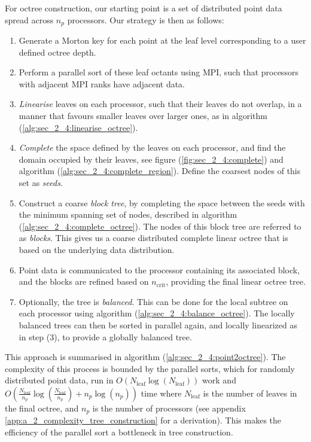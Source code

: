 For octree construction, our starting point is a set of distributed point data spread across $n_p$ processors. Our strategy is then as follows:

\begin{enumerate}
    \item Generate a Morton key for each point at the leaf level corresponding to a user defined octree depth.
    \item Perform a parallel sort of these leaf octants using MPI, such that processors with adjacent MPI ranks have adjacent data.
    \item \textit{Linearise} leaves on each processor, such that their leaves do not overlap, in a manner that favours smaller leaves over larger ones, as in algorithm (\ref{alg:sec_2_4:linearise_octree}). 
    \item \textit{Complete} the space defined by the leaves on each processor, and find the domain occupied by their leaves, see figure (\ref{fig:sec_2_4:complete}) and algorithm (\ref{alg:sec_2_4:complete_region}). Define the coarsest nodes of this set as \textit{seeds}.
    \item Construct a coarse \textit{block tree}, by completing the space between the seeds with the minimum spanning set of nodes, described in algorithm (\ref{alg:sec_2_4:complete_octree}). The nodes of this block tree are referred to as \textit{blocks}. This gives us a coarse distributed complete linear octree that is based on the underlying data distribution.
    \item Point data is communicated to the processor containing its associated block, and the blocks are refined based on $n_{\text{crit}}$, providing the final linear octree tree.
    \item Optionally, the tree is \textit{balanced}. This can be done for the local subtree on each processor using algorithm (\ref{alg:sec_2_4:balance_octree}). The locally balanced trees can then be sorted in parallel again, and locally linearized as in step (3), to provide a globally balanced tree.
\end{enumerate}

This approach is summarised in algorithm (\ref{alg:sec_2_4:point2octree}). The complexity of this process is bounded by the parallel sorts, which for randomly distributed point data, run in $O(N_{\text{leaf}} \log (N_{\text{leaf}}))$ work and $O(\frac{N_{\text{leaf}}}{n_p} \log(\frac{N_{\text{leaf}}}{n_p}) + n_p \log (n_p))$ time where $N_{\text{leaf}}$ is the number of leaves in the final octree, and $n_p$ is the number of processors (see appendix \ref{app:a_2_complexity_tree_construction} for a derivation). This makes the efficiency of the parallel sort a bottleneck in tree construction.

